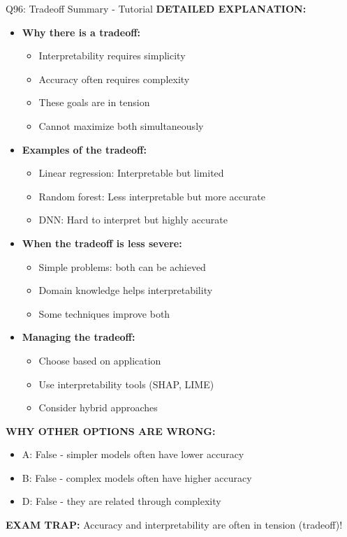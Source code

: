 \documentclass[8pt]{beamer}
\begin{document}
\begin{frame}{Q96: Tradeoff Summary - Tutorial}
		\vspace{0.05cm}
		\textbf{DETAILED EXPLANATION:}
		\begin{itemize}
			\item \textbf{Why there is a tradeoff:}
			\begin{itemize}
				\item Interpretability requires simplicity
				\item Accuracy often requires complexity
				\item These goals are in tension
				\item Cannot maximize both simultaneously
			\end{itemize}
			\item \textbf{Examples of the tradeoff:}
			\begin{itemize}
				\item Linear regression: Interpretable but limited
				\item Random forest: Less interpretable but more accurate
				\item DNN: Hard to interpret but highly accurate
			\end{itemize}
			\item \textbf{When the tradeoff is less severe:}
			\begin{itemize}
				\item Simple problems: both can be achieved
				\item Domain knowledge helps interpretability
				\item Some techniques improve both
			\end{itemize}
			\item \textbf{Managing the tradeoff:}
			\begin{itemize}
				\item Choose based on application
				\item Use interpretability tools (SHAP, LIME)
				\item Consider hybrid approaches
			\end{itemize}
		\end{itemize}
		
		\vspace{0.05cm}
		\textcolor{myred}{\textbf{WHY OTHER OPTIONS ARE WRONG:}}
		\begin{itemize}
			\item \textcolor{myred}{A:} False - simpler models often have lower accuracy
			\item \textcolor{myred}{B:} False - complex models often have higher accuracy
			\item \textcolor{myred}{D:} False - they are related through complexity
		\end{itemize}
		
		\textcolor{myred}{\textbf{EXAM TRAP:}} Accuracy and interpretability are often in tension (tradeoff)!
	\end{frame}
	
\end{document}
